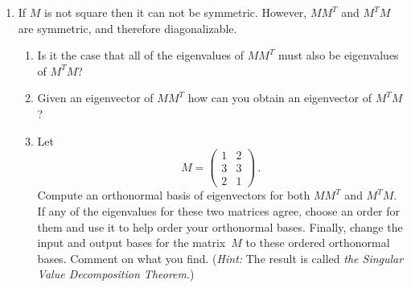 \begin{enumerate}
\item If $M$ is not square then it can not be symmetric. However, $MM^T$ and $M^TM$ are symmetric, and therefore diagonalizable. 
\begin{enumerate}
\item Is it the case that all of the eigenvalues of $MM^T$ must also be eigenvalues of $M^TM$? 
\item Given an eigenvector of $MM^T$ how can you obtain an eigenvector of $M^TM$?
\item Let $$M=\begin{pmatrix}1&2\\3&3\\2&1\end{pmatrix}\, .$$
Compute an orthonormal basis of eigenvectors for both $MM^T$ and $M^TM$. If any of the eigenvalues for these two matrices agree,
choose an order for them and use it to help order your orthonormal bases. Finally, change the input and output bases
for the matrix~$M$ to these ordered orthonormal bases. Comment on what you find. ({\it Hint:} 
The result is called \emph{the Singular Value Decomposition Theorem}.) 
\end{enumerate}












\end{enumerate}

